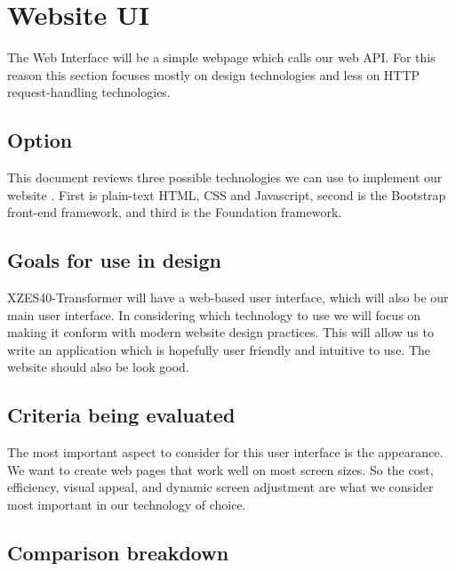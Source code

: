 \section{Website UI}

The Web Interface will be a simple webpage which calls our web API.
For this reason this section focuses mostly on design technologies and less on HTTP request-handling technologies.

\subsection{Option}

This document reviews three possible technologies we can use to implement our website .
First is plain-text HTML, CSS and Javascript, second is the Bootstrap front-end framework, and third is the Foundation framework.

\subsection{Goals for use in design}

XZES40-Transformer will have a web-based user interface, which will also be our main user interface.
In considering which technology to use we will focus on making it conform with modern website design practices.
This will allow us to write an application which is hopefully user friendly and intuitive to use.
The website should also be look good.

\subsection{Criteria being evaluated}

The most important aspect to consider for this user interface is the appearance.
We want to create web pages that work well on most screen sizes.
So the cost, efficiency, visual appeal, and dynamic screen adjustment are what we consider most important in our technology of choice.

\subsection{Comparison breakdown}

